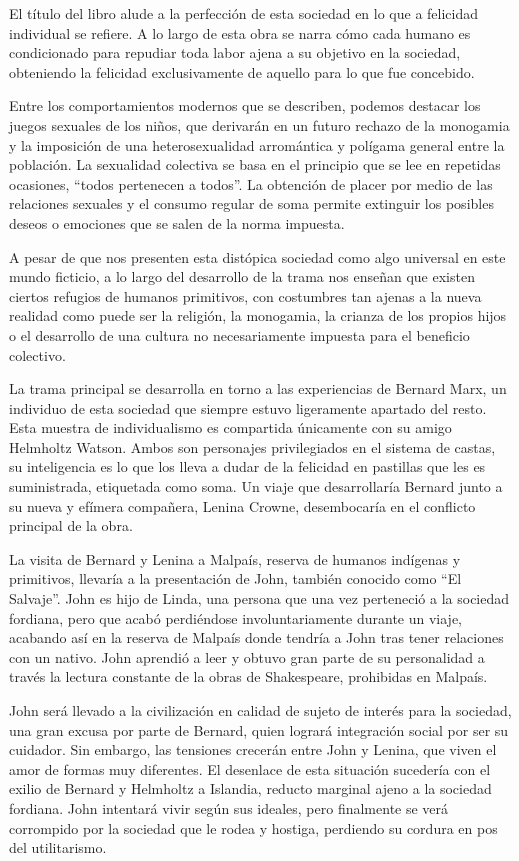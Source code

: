 \documentclass[11pt]{article}
\begin{document}
El título del libro alude a la perfección de esta sociedad en lo que a felicidad individual se refiere. A lo largo de esta obra se narra cómo cada humano es condicionado para repudiar toda labor ajena a su objetivo en la sociedad, obteniendo la felicidad exclusivamente de aquello para lo que fue concebido.

Entre los comportamientos modernos que se describen, podemos destacar los juegos sexuales de los niños, que derivarán en un futuro rechazo de la monogamia y la imposición de una heterosexualidad arromántica y polígama general entre la población. La sexualidad colectiva se basa en el principio que se lee en repetidas ocasiones, ``todos pertenecen a todos''. La obtención de placer por medio de las relaciones sexuales y el consumo regular de soma permite extinguir los posibles deseos o emociones que se salen de la norma impuesta.

A pesar de que nos presenten esta distópica sociedad como algo universal en este mundo ficticio, a lo largo del desarrollo de la trama nos enseñan que existen ciertos refugios de humanos primitivos, con costumbres tan ajenas a la nueva realidad como puede ser la religión, la monogamia, la crianza de los propios hijos o el desarrollo de una cultura no necesariamente impuesta para el beneficio colectivo.

La trama principal se desarrolla en torno a las experiencias de Bernard Marx, un individuo de esta sociedad que siempre estuvo ligeramente apartado del resto. Esta muestra de individualismo es compartida únicamente con su amigo Helmholtz Watson. Ambos son personajes privilegiados en el sistema de castas, su inteligencia es lo que los lleva a dudar de la felicidad en pastillas que les es suministrada, etiquetada como soma. Un viaje que desarrollaría Bernard junto a su nueva y efímera compañera, Lenina Crowne, desembocaría en el conflicto principal de la obra.

La visita de Bernard y Lenina a Malpaís, reserva de humanos indígenas y primitivos, llevaría a la presentación de John, también conocido como ``El Salvaje''. John es hijo de Linda, una persona que una vez perteneció a la sociedad fordiana, pero que acabó perdiéndose involuntariamente durante un viaje, acabando así en la reserva de Malpaís donde tendría a John tras tener relaciones con un nativo. John aprendió a leer y obtuvo gran parte de su personalidad a través la lectura constante de la obras de Shakespeare, prohibidas en Malpaís.

John será llevado a la civilización en calidad de sujeto de interés para la sociedad, una gran excusa por parte de Bernard, quien logrará integración social por ser su cuidador. Sin embargo, las tensiones crecerán entre John y Lenina, que viven el amor de formas muy diferentes. El desenlace de esta situación sucedería con el exilio de Bernard y Helmholtz a Islandia, reducto marginal ajeno a la sociedad fordiana. John intentará vivir según sus ideales, pero finalmente se verá corrompido por la sociedad que le rodea y hostiga, perdiendo su cordura en pos del utilitarismo.
\end{document}
